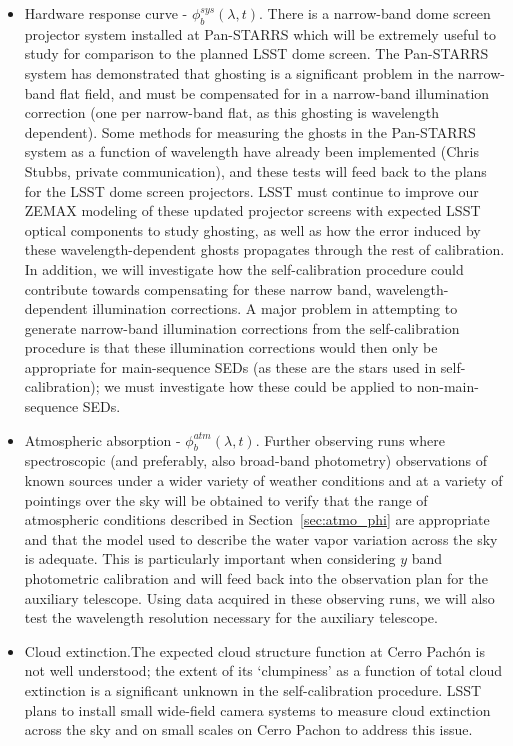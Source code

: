 \documentclass[12pt,preprint]{aastex}
\begin{document}
\begin{itemize}
\item{Hardware response curve - $\phi_b^{sys}(\lambda,t)$. There is a
    narrow-band dome screen projector system installed at Pan-STARRS which
    will be extremely useful to study for comparison to the planned LSST
    dome screen. The Pan-STARRS system has demonstrated that ghosting is a
    significant problem in the narrow-band flat field, and must be
    compensated for in a narrow-band illumination correction (one per
    narrow-band flat, as this ghosting is wavelength dependent).  Some
    methods for measuring the ghosts in the Pan-STARRS system as a function of
    wavelength have already been implemented (Chris Stubbs, private
    communication), and these tests will feed back to the plans for the
    LSST dome screen projectors. LSST must continue to improve our ZEMAX
    modeling of these updated projector screens with expected LSST optical
    components to study ghosting, as well as how the error induced by
    these wavelength-dependent ghosts propagates through the rest of
    calibration. In addition, we will investigate how the self-calibration
    procedure could contribute towards compensating for these narrow band,
    wavelength-dependent illumination corrections. A major problem in
    attempting to generate narrow-band illumination corrections from
    the self-calibration procedure is that these illumination
    corrections would then only be appropriate for main-sequence SEDs
    (as these are the stars used in self-calibration); we must
    investigate how these could be applied to non-main-sequence SEDs.  }

\item{Atmospheric absorption - $\phi_b^{atm}(\lambda,t)$. Further
    observing runs where spectroscopic (and preferably, also
    broad-band photometry) observations of known sources under a wider
    variety of weather conditions and at a variety of pointings over
    the sky will be obtained to verify that the range of atmospheric
    conditions described in Section~\ref{sec:atmo_phi} are appropriate
    and that the model used to describe the water vapor variation
    across the sky is adequate. This is particularly important when
    considering $y$ band photometric calibration and will feed back
    into the observation plan for the auxiliary telescope. Using data acquired
    in these observing runs, we will also test the
    wavelength resolution necessary for the auxiliary telescope.}

\item{Cloud extinction.The expected cloud structure function at Cerro
     Pach\'{o}n is not well understood; the extent of its `clumpiness' as a
    function of total cloud extinction is a significant unknown in the
    self-calibration procedure. LSST plans to install 
    small wide-field camera systems to measure cloud extinction across the sky and on small
    scales on Cerro Pachon to address this issue. }


\end{itemize}
\end{document}
